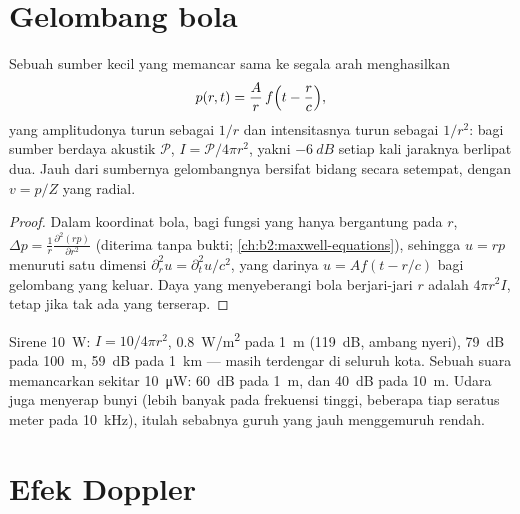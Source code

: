 \section{Gelombang bola}

\begin{proposition}\label{prop:b2:sound-waves:spherical}
Sebuah sumber kecil yang memancar sama ke segala arah menghasilkan
\[
p(r, t) = \frac{A}{r}\,f\Bigl(t - \frac rc\Bigr) ,
\]
yang amplitudonya turun sebagai $1/r$ dan intensitasnya turun sebagai $1/r^2$:
bagi sumber berdaya akustik $\mathcal P$, $I = \mathcal P/4\pi r^2$, yakni
$-\qty{6}{dB}$ setiap kali jaraknya berlipat dua. Jauh dari sumbernya
gelombangnya bersifat bidang secara setempat, dengan $v = p/Z$ yang radial.
\end{proposition}

\begin{proof}
Dalam koordinat bola, bagi fungsi yang hanya bergantung pada $r$, $\Delta p =
\frac1r\frac{\partial^2(rp)}{\partial r^2}$ (diterima tanpa bukti; \cref{ch:b2:maxwell-equations}),
sehingga $u = rp$ menuruti  satu dimensi $\partial_r^2u = \partial_t^2u/c^2$,
yang darinya $u = Af(t - r/c)$ bagi gelombang yang keluar. Daya yang menyeberangi
bola berjari-jari $r$ adalah $4\pi r^2I$, tetap jika tak ada yang terserap.
\end{proof}

\begin{example}\label{ex:b2:sound-waves:siren}
Sirene \qty{10}{W}: $I = 10/4\pi r^2$, \qty{0.8}{W/m^2} pada \qty{1}{m} (\qty{119}{dB},
ambang nyeri), \qty{79}{dB} pada \qty{100}{m}, \qty{59}{dB} pada \qty{1}{km} --- masih terdengar di seluruh
kota. Sebuah suara memancarkan sekitar \qty{10}{\micro W}: \qty{60}{dB} pada \qty{1}{m},
dan \qty{40}{dB} pada \qty{10}{m}. Udara juga menyerap bunyi (lebih banyak pada frekuensi
tinggi, beberapa  tiap seratus meter pada \qty{10}{kHz}), itulah sebabnya
guruh yang jauh menggemuruh rendah.
\end{example}

\section{Efek Doppler}

